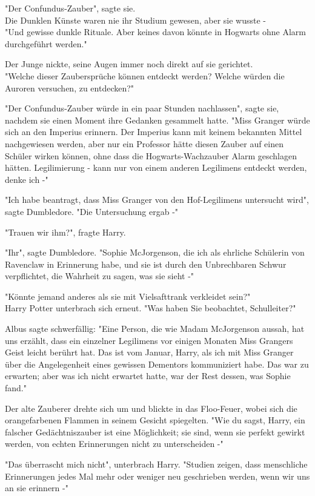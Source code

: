 {"Der Confundus-Zauber", sagte sie.\\ Die Dunklen Künste waren nie ihr Studium gewesen, aber sie wusste -\\ "Und gewisse dunkle Rituale. Aber keines davon könnte in Hogwarts ohne Alarm durchgeführt werden."

Der Junge nickte, seine Augen immer noch direkt auf sie gerichtet.\\ "Welche dieser Zaubersprüche können entdeckt werden? Welche würden die Auroren versuchen, zu entdecken?"

"Der Confundus-Zauber würde in ein paar Stunden nachlassen", sagte sie, nachdem sie einen Moment ihre Gedanken gesammelt hatte. "Miss Granger würde sich an den Imperius erinnern. Der Imperius kann mit keinem bekannten Mittel nachgewiesen werden, aber nur ein Professor hätte diesen Zauber auf einen Schüler wirken können, ohne dass die Hogwarts-Wachzauber Alarm geschlagen hätten. Legilimierung - kann nur von einem anderen Legilimens entdeckt werden, denke ich -"

"Ich habe beantragt, dass Miss Granger von den Hof-Legilimens untersucht wird", sagte Dumbledore. "Die Untersuchung ergab -"

"Trauen wir ihm?", fragte Harry.

"Ihr", sagte Dumbledore. "Sophie McJorgenson, die ich als ehrliche Schülerin von Ravenclaw in Erinnerung habe, und sie ist durch den Unbrechbaren Schwur verpflichtet, die Wahrheit zu sagen, was sie sieht -"

"Könnte jemand anderes als sie mit Vielsafttrank verkleidet sein?"\\ Harry Potter unterbrach sich erneut. "Was haben Sie beobachtet, Schulleiter?"

Albus sagte schwerfällig: "Eine Person, die wie Madam McJorgenson aussah, hat uns erzählt, dass ein einzelner Legilimens vor einigen Monaten Miss Grangers Geist leicht berührt hat. Das ist vom Januar, Harry, als ich mit Miss Granger über die Angelegenheit eines gewissen Dementors kommuniziert habe. Das war zu erwarten; aber was ich nicht erwartet hatte, war der Rest dessen, was Sophie fand."

Der alte Zauberer drehte sich um und blickte in das Floo-Feuer, wobei sich die orangefarbenen Flammen in seinem Gesicht spiegelten. "Wie du sagst, Harry, ein falscher Gedächtniszauber ist eine Möglichkeit; sie sind, wenn sie perfekt gewirkt werden, von echten Erinnerungen nicht zu unterscheiden -"

"Das überrascht mich nicht", unterbrach Harry. "Studien zeigen, dass menschliche Erinnerungen jedes Mal mehr oder weniger neu geschrieben werden, wenn wir uns an sie erinnern -"

}
